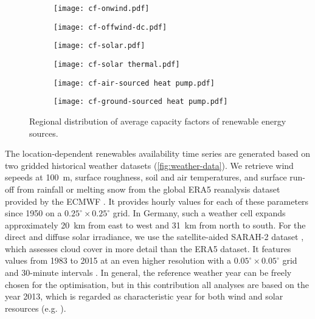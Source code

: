 \begin{figure}
    \centering
    \begin{subfigure}[t]{0.49\textwidth}
        \centering
        \texttt{[image: cf-onwind.pdf]}
    \end{subfigure}
    \begin{subfigure}[t]{0.49\textwidth}
        \centering
        \texttt{[image: cf-offwind-dc.pdf]}
    \end{subfigure}
    \begin{subfigure}[t]{0.49\textwidth}
        \centering
        \texttt{[image: cf-solar.pdf]}
    \end{subfigure}
    \begin{subfigure}[t]{0.49\textwidth}
        \centering
        \texttt{[image: cf-solar thermal.pdf]}
    \end{subfigure}
    \begin{subfigure}[t]{0.49\textwidth}
        \centering
        \texttt{[image: cf-air-sourced heat pump.pdf]}
    \end{subfigure}
    \begin{subfigure}[t]{0.49\textwidth}
        \centering
        \texttt{[image: cf-ground-sourced heat pump.pdf]}
    \end{subfigure}
    \caption{Regional distribution of average capacity factors of renewable energy sources.}
    \label{fig:cfs-maps}
\end{figure}




The location-dependent renewables availability time series are generated based
on two gridded historical weather datasets (\cref{fig:weather-data}). We
retrieve wind sepeeds at \SI{100}{\metre}, surface roughness, soil and air
temperatures, and surface run-off from rainfall or melting snow from the global
ERA5 reanalysis dataset provided by the ECMWF . It provides hourly
values for each of these parameters since 1950 on a $0.25^{\circ} \times
0.25^{\circ}$ grid. In Germany, such a weather cell expands approximately
\SI{20}{\kilo\metre} from east to west and \SI{31}{km} from north to south. For
the direct and diffuse solar irradiance, we use the satellite-aided SARAH-2
dataset , which assesses cloud cover in more detail than the ERA5 dataset. It
features values from 1983 to 2015 at an even higher resolution with a
$0.05^{\circ} \times 0.05^{\circ}$ grid and 30-minute intervals . In
general, the reference weather year can be freely chosen for the optimisation,
but in this contribution all analyses are based on the year 2013, which is
regarded as characteristic year for both wind and solar resources (e.g.
).

